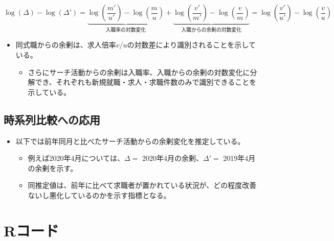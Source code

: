 \documentclass[
]{book}
\providecommand{\tightlist}{%
  \setlength{\itemsep}{0pt}\setlength{\parskip}{0pt}}
\begin{document}
\[\log (\Delta) - \log(\Delta')=\underbrace{\log(\frac{m'}{u'})-\log(\frac{m}{u})}_{入職率の対数変化} + \underbrace{\log(\frac{v'}{m'})-\log(\frac{v}{m})}_{入職からの余剰の対数変化} = \log(\frac{v'}{u'})-\log(\frac{v}{u})\]

\begin{itemize}
\item
  同式職からの余剰は、求人倍率\(v/u\)の対数差により識別されることを示している。

  \begin{itemize}
  \tightlist
  \item
    さらにサーチ活動からの余剰は入職率、入職からの余剰の対数変化に分解でき、それぞれも新規就職・求人・求職件数のみで識別できることを示している。
  \end{itemize}
\end{itemize}

\hypertarget{ux6642ux7cfbux5217ux6bd4ux8f03ux3078ux306eux5fdcux7528}{%
\subsection{時系列比較への応用}\label{ux6642ux7cfbux5217ux6bd4ux8f03ux3078ux306eux5fdcux7528}}

\begin{itemize}
\item
  以下では前年同月と比べたサーチ活動からの余剰変化を推定している。

  \begin{itemize}
  \item
    例えば2020年4月については、\(\Delta=\) 2020年4月の余剰、\(\Delta'=\) 2019年4月の余剰を示す。
  \item
    同推定値は、前年に比べて求職者が置かれている状況が、どの程度改善ないし悪化しているのかを示す指標となる。
  \end{itemize}
\end{itemize}

\hypertarget{rux30b3ux30fcux30c9-1}{%
\section{Rコード}\label{rux30b3ux30fcux30c9-1}}
\end{document}
